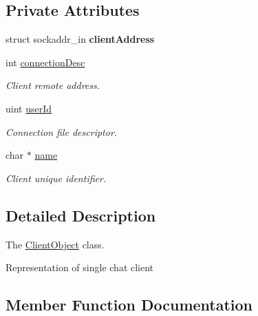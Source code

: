 \subsection*{Private Attributes}
\begin{DoxyCompactItemize}
\item 
\mbox{\label{classClientObject_a9f699539d7adac42a71e4bf6501c0c53}} 
struct sockaddr\+\_\+in {\bfseries client\+Address}
\item 
\mbox{\label{classClientObject_a6592e5413c789857a68b836c7b27c7b1}} 
int \hyperlink{classClientObject_a6592e5413c789857a68b836c7b27c7b1}{connection\+Desc}
\begin{DoxyCompactList}\small\item\em Client remote address. \end{DoxyCompactList}\item 
\mbox{\label{classClientObject_ab4b229b46fe32b699598051074a4f71b}} 
uint \hyperlink{classClientObject_ab4b229b46fe32b699598051074a4f71b}{user\+Id}
\begin{DoxyCompactList}\small\item\em Connection file descriptor. \end{DoxyCompactList}\item 
\mbox{\label{classClientObject_a29fa4c21633a35a7321e255e7ac10dbc}} 
char $\ast$ \hyperlink{classClientObject_a29fa4c21633a35a7321e255e7ac10dbc}{name}
\begin{DoxyCompactList}\small\item\em Client unique identifier. \end{DoxyCompactList}\end{DoxyCompactItemize}


\subsection{Detailed Description}
The \hyperlink{classClientObject}{Client\+Object} class. 

Representation of single chat client 

\subsection{Member Function Documentation}
\mbox{\label{classClientObject_a4704430f61bd85efd980c6ea083d5374}} 
